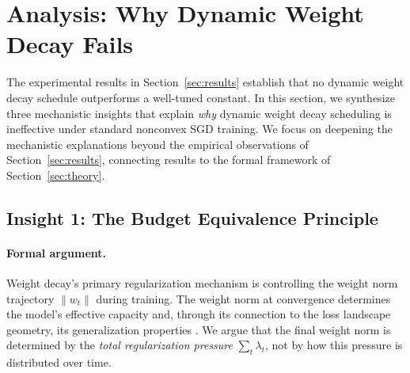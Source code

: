 \documentclass{article}
\begin{document}
\section{Analysis: Why Dynamic Weight Decay Fails}
\label{sec:analysis}

The experimental results in Section~\ref{sec:results} establish that no dynamic
weight decay schedule outperforms a well-tuned constant.
In this section, we synthesize three mechanistic insights that explain \emph{why}
dynamic weight decay scheduling is ineffective under standard nonconvex SGD training.
We focus on deepening the mechanistic explanations beyond the empirical observations
of Section~\ref{sec:results}, connecting results to the formal framework of
Section~\ref{sec:theory}.

\subsection{Insight 1: The Budget Equivalence Principle}

\paragraph{Formal argument.}
Weight decay's primary regularization mechanism is controlling the weight norm
trajectory $\|w_t\|$ during training.
The weight norm at convergence determines the model's effective capacity and, through
its connection to the loss landscape geometry, its generalization properties
\citep{neyshabur2015norm, bartlett2017spectrally}.
We argue that the final weight norm is determined by the \emph{total regularization
pressure} $\sum_t \lambda_t$, not by how this pressure is distributed over time.
\end{document}

